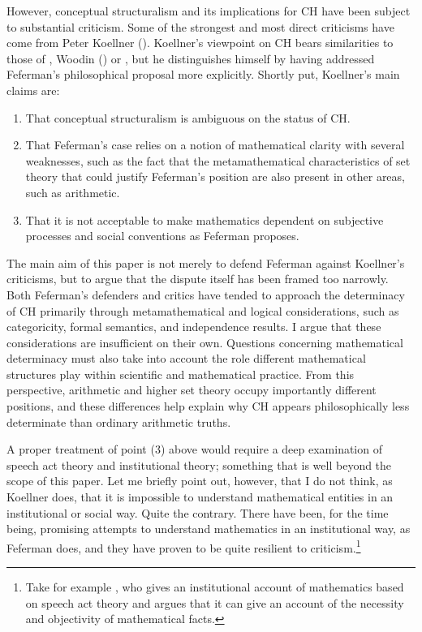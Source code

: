 \documentclass[11pt,a4paper]{book}
\theoremstyle{plain}
\begin{document}
However, conceptual structuralism and its implications for CH have been subject to substantial criticism. Some of the strongest and most direct criticisms have come from Peter Koellner (\citeyear{Koellner2016,Koellner2022}). Koellner's viewpoint on CH bears similarities to those of \textcite{Parsons2016b}, Woodin (\citeyear{Woodin2001a,Woodin2001b}) or \textcite{Maddy1997}, but he distinguishes himself by having addressed Feferman's philosophical proposal more explicitly. Shortly put, Koellner's main claims are:

\begin{enumerate}
\item That conceptual structuralism is ambiguous on the status of CH.
\item That Feferman's case relies on a notion of mathematical clarity with several weaknesses, such as the fact that the metamathematical characteristics of set theory that could justify Feferman's position are also present in other areas, such as arithmetic.
\item That it is not acceptable to make mathematics dependent on subjective processes and social conventions as Feferman proposes.
\end{enumerate}

The main aim of this paper is not merely to defend Feferman against Koellner's criticisms, but to argue that the dispute itself has been framed too narrowly. Both Feferman's defenders and critics have tended to approach the determinacy of CH primarily through metamathematical and logical considerations, such as categoricity, formal semantics, and independence results. I argue that these considerations are insufficient on their own. Questions concerning mathematical determinacy must also take into account the role different mathematical structures play within scientific and mathematical practice. From this perspective, arithmetic and higher set theory occupy importantly different positions, and these differences help explain why CH appears philosophically less determinate than ordinary arithmetic truths.

A proper treatment of point (3) above would require a deep examination of speech act theory and institutional theory; something that is well beyond the scope of this paper. Let me briefly point out, however, that I do not think, as Koellner does, that it is impossible to understand mathematical entities in an institutional or social way. Quite the contrary. There have been, for the time being, promising attempts to understand mathematics in an institutional way, as Feferman does, and they have proven to be quite resilient to criticism.\footnote{Take for example \textcite{Cole2013}, who gives an institutional account of mathematics based on speech act theory and argues that it can give an account of the necessity and objectivity of mathematical facts.}
\end{document}
